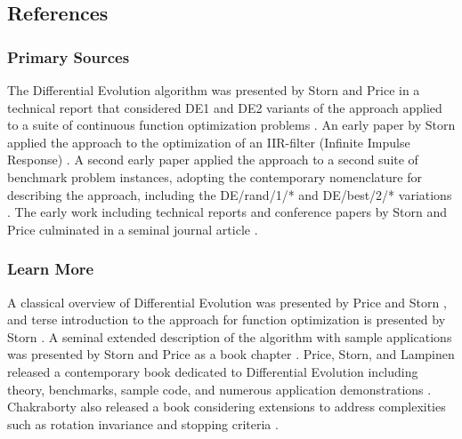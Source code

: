 


\subsection{References}

% 
% 
\subsubsection{Primary Sources}
The Differential Evolution algorithm was presented by Storn and Price in a technical report that considered DE1 and DE2 variants of the approach applied to a suite of continuous function optimization problems \cite{Storn1995}. 
An early paper by Storn applied the approach to the optimization of an IIR-filter (Infinite Impulse Response) \cite{Storn1996a}. A second early paper applied the approach to a second suite of benchmark problem instances, adopting the contemporary nomenclature for describing the approach, including the DE/rand/1/* and DE/best/2/* variations \cite{Storn1996b}.
The early work including technical reports and conference papers by Storn and Price culminated in a seminal journal article \cite{Storn1997}.

% 
% 
\subsubsection{Learn More}
A classical overview of Differential Evolution was presented by Price and Storn \cite{Price1997}, and terse introduction to the approach for function optimization is presented by Storn \cite{Storn1996}. A seminal extended description of the algorithm with sample applications was presented by Storn and Price as a book chapter \cite{Price1999}.
Price, Storn, and Lampinen released a contemporary book dedicated to Differential Evolution including theory, benchmarks, sample code, and numerous application demonstrations \cite{Price2005}. Chakraborty also released a book considering extensions to address complexities such as rotation invariance and stopping criteria  \cite{Chakraborty2008}.


